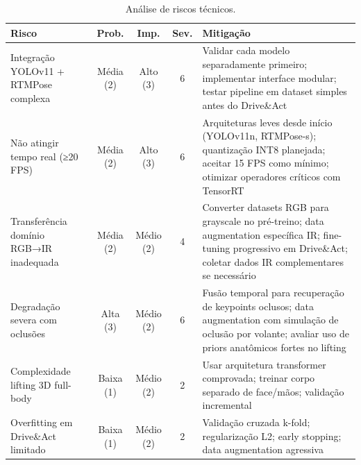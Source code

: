 \documentclass[12pt, a4paper]{article}
\begin{document}
\begin{table}[H]
    \centering
    \caption{Análise de riscos técnicos.}
    \small
    \begin{tabular}{|p{3.5cm}|c|c|c|p{4cm}|}
        \hline
        \textbf{Risco} & \textbf{Prob.} & \textbf{Imp.} & \textbf{Sev.} & \textbf{Mitigação} \\ \hline
        
        Integração YOLOv11 + RTMPose complexa & 
        Média (2) & 
        Alto (3) & 
        6 & 
        Validar cada modelo separadamente primeiro; implementar interface modular; testar pipeline em dataset simples antes do Drive\&Act \\ \hline
        
        Não atingir tempo real (≥20 FPS) & 
        Média (2) & 
        Alto (3) & 
        6 & 
        Arquiteturas leves desde início (YOLOv11n, RTMPose-s); quantização INT8 planejada; aceitar 15 FPS como mínimo; otimizar operadores críticos com TensorRT \\ \hline
        
        Transferência domínio RGB→IR inadequada & 
        Média (2) & 
        Médio (2) & 
        4 & 
        Converter datasets RGB para grayscale no pré-treino; data augmentation específica IR; fine-tuning progressivo em Drive\&Act; coletar dados IR complementares se necessário \\ \hline
        
        Degradação severa com oclusões & 
        Alta (3) & 
        Médio (2) & 
        6 & 
        Fusão temporal para recuperação de keypoints oclusos; data augmentation com simulação de oclusão por volante; avaliar uso de priors anatômicos fortes no lifting \\ \hline
        
        Complexidade lifting 3D full-body & 
        Baixa (1) & 
        Médio (2) & 
        2 & 
        Usar arquitetura transformer comprovada; treinar corpo separado de face/mãos; validação incremental \\ \hline
        
        Overfitting em Drive\&Act limitado & 
        Baixa (1) & 
        Médio (2) & 
        2 & 
        Validação cruzada k-fold; regularização L2; early stopping; data augmentation agressiva \\ \hline
        
    \end{tabular}
\end{table}
\end{document}
